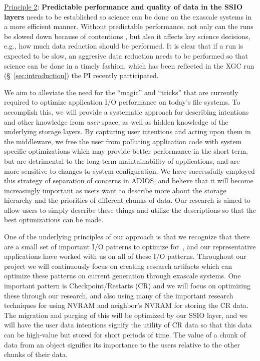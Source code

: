 \underline{Principle 2}: {\bf Predictable performance and quality of data in the SSIO layers} needs to be
established so science can be done on the exascale systems in a more efficient manner. Without
predictable performance, not only can the runs be slowed down because of contentions \cite{liu_hotstorage}, 
but also it affects key science decisions, e.g., how much data reduction should be performed.
It is clear that if a run is expected to be slow, an aggresive data reduction needs to be performed
so that science can be done in a timely fashion, which has been reflected in the XGC run (\S~\ref{sec:introduction})
the PI recently participated.

We aim to alleviate the need for the ``magic'' and ``tricks''
that are currently required to optimize application I/O performance
on today's file systems. To accomplish this, we will provide a systematic
approach for describing intentions and other knowledge from {\it user}
space, as well as hidden knowledge of the underlying storage layers.
By capturing user intentions and acting upon them in the middleware, we
free the user from polluting application code with system specific
optimizations which may provide better performance in the short term,
but are detrimental to the long-term maintainability of applications, and
are more sensitive to changes to system configuration. We have successfully
employed this strategy of separation of concerns in ADIOS, and believe that
it will become increasingly important as users want to describe more about
the storage hierarchy and the priorities of different chunks of data. 
Our research is aimed to allow users to simply describe these things and
utilize the descriptions so that the best optimizations can be made.

One of the underlying principles of our approach is that we recognize that there are a small set
of important I/O patterns to optimize for~\cite{lofstead2011six,polte2009and,tian2011edo,tian2012system},
and our representative applications have worked with us on all of these I/O patterns. Throughout our project
we will continuously focus on creating research artifacts which can optimize these patterns on current generation through
exascale systems.  One important pattern is Checkpoint/Restarts (CR) and we will focus on optimizing these through our
research, and also using many of the important research techniques for using NVRAM and neighbor's NVRAM for storing 
the CR data. The migration and purging of this will be optimized by our SSIO layer, and we will have the user data intentions
signify the utility of CR data so that this data can be high-value but stored for short periods of time. The value of a chunk of data
from an object signifies its importance to the users relative to the other chunks of their data.


